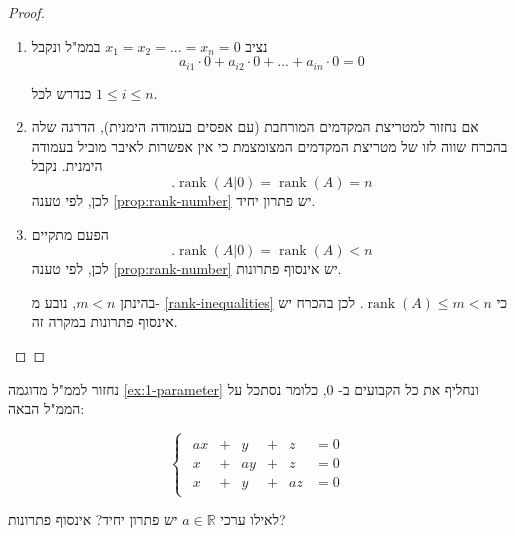\documentclass[
  hebrew,
  12pt,
  a4paper,
  oneside]{book}
\theoremstyle{definition}
\theoremstyle{remark}
\theoremstyle{plain}
\theoremstyle{remark}
\begin{document}
\begin{proof}
~

\begin{enumerate}
\def\labelenumi{\arabic{enumi}.}
\item
  נציב \(x_1=x_2=...=x_n=0\) בממ"ל ונקבל
  \[a_{i1}\cdot0+a_{i2}\cdot0+...+a_{in}\cdot 0=0\]

  כנדרש לכל \(1\leq i\leq n\).
\item
  אם נחזור למטריצת המקדמים המורחבת (עם אפסים בעמודה הימנית), הדרגה שלה
  בהכרח שווה לזו של מטריצת המקדמים המצומצמת כי אין אפשרות לאיבר מוביל
  בעמודה הימנית. נקבל
  \[.\mathop{\mathrm{rank}}(A|0)=\mathop{\mathrm{rank}}(A)=n\] לכן, לפי
  טענה \ref{prop:rank-number} יש פתרון יחיד.
\item
  הפעם מתקיים
  \[.\mathop{\mathrm{rank}}(A|0)=\mathop{\mathrm{rank}}(A)<n\] לכן, לפי
  טענה \ref{prop:rank-number} יש אינסוף פתרונות.

  בהינתן \(m<n\), נובע מ- \ref{rank-inequalities} כי
  \(\mathop{\mathrm{rank}}(A)\leq m<n\). לכן בהכרח יש אינסוף פתרונות
  במקרה זה.
\end{enumerate}

~◻
\end{proof}

\begin{exercise}

נחזור לממ"ל מדוגמה \ref{ex:1-parameter} ונחליף את כל הקבועים ב- \(0\),
כלומר נסתכל על הממ"ל הבאה:

\[\begin{cases}
\begin{alignedat}{7}
a x &{}+{}&  y &{}+{}&  z &= 0 \\[4pt]
x &{}+{}&  a y &{}+{}&  z &= 0 \\[4pt]
x &{}+{}&  y &{}+{}&  a z &= 0
\end{alignedat}
\end{cases}\]

לאילו ערכי \(a\in\mathbb R\) יש פתרון יחיד? אינסוף פתרונות?

\end{exercise}
\end{document}
